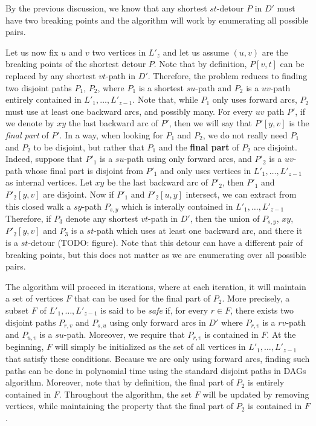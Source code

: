 \documentclass[utf8,11pt]{article}
\theoremstyle{plain}
\theoremstyle{definition}
\begin{document}
By the previous discussion, we know that any shortest $st$-detour $P$ in $D'$ must have two breaking points and the algorithm will work by enumerating all possible pairs.

Let us now fix $u$ and $v$ two vertices in $L'_z$ and let us assume $(u,v)$ are the breaking points of the shortest detour $P$. Note that by definition, $P[v,t]$ can be replaced by any shortest $vt$-path in $D'$. Therefore, the problem reduces to finding two disjoint paths $P_1$, $P_2$, where $P_1$ is a shortest $su$-path and $P_2$ is a $uv$-path entirely contained in $L'_1, \dots, L'_{z-1}$. Note that, while $P_1$ only uses forward arcs, $P_2$ must use at least one backward arcs, and possibly many. For every $uv$ path $P'$, if we denote by $xy$ the last backward arc of $P'$, then we will say that $P'[y,v]$ is the \textit{final part} of $P'$. In a way, when looking for $P_1$ and $P_2$, we do not really need $P_1$ and $P_2$ to be disjoint, but rather that $P_1$ and the \textbf{final part} of $P_2$ are disjoint. Indeed, suppose that $P'_1$ is a $su$-path using only forward arcs, and $P'_2$ is a $uv$-path whose final part is disjoint from $P'_1$ and only uses vertices in $L'_1, \dots, L'_{z-1}$ as internal vertices. Let $xy$ be the last backward arc of $P'_2$, then $P'_1$ and $P'_2[y,v]$ are disjoint. Now if $P'_1$ and $P'_2[u,y]$ intersect, we can extract from this closed walk a $sy$-path $P_{s,y}$ which is interally contained in $L'_1, \dots, L'_{z-1}$
Therefore, if $P_3$ denote any shortest $vt$-path in $D'$, then the union of $P_{s,y}$, $xy$, $P'_2[y,v]$ and $P_3$ is a $st$-path which uses at least one backward arc, and there it is a $st$-detour (TODO: figure). Note that this detour can have a different pair of breaking points, but this does not matter as we are enumerating over all possible pairs.


The algorithm will proceed in iterations, where at each iteration, it will maintain a set of vertices $F$ that can be used for the final part of $P_2$. More precisely, a subset $F$ of $L'_1, \dots, L'_{z-1}$ is said to be \textit{safe} if, for every $r \in F$, there exists two disjoint paths $P_{r,v}$ and $P_{s,u}$ using only forward arcs in $D'$ where $P_{r,v}$ is a $rv$-path and $P_{u,v}$ is a $su$-path. Moreover, we require that $P_{r,v}$ is contained in $F$. At the beginning, $F$ will simply be initialized as the set of all vertices in $L'_1, \dots, L'_{z-1}$ that satisfy these conditions. Because we are only using forward arcs, finding such paths can be done in polynomial time using the standard disjoint paths in DAGs algorithm. Moreover, note that by definition, the final part of $P_2$ is entirely contained in $F$. Throughout the algorithm, the set $F$ will be updated by removing vertices, while maintaining the property that the final part of $P_2$ is contained in $F$. 
\end{document}
